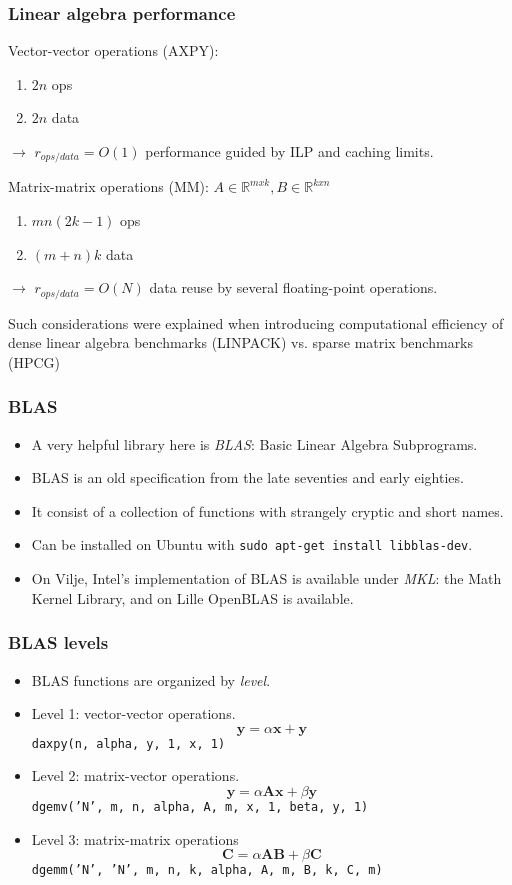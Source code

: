 \begin{frame}
  \frametitle{Linear algebra performance}

Vector-vector operations (AXPY):
\begin{enumerate}
\item $2n$ ops
\item $2n$ data
\end{enumerate}
$\rightarrow$ $r_{ops/data} = O(1)$ performance guided by ILP and caching limits.

\bigskip
Matrix-matrix operations (MM): $A \in \mathbb R^{mxk}, B \in \mathbb R^{kxn}$
\begin{enumerate}
\item $mn(2k-1)$ ops
\item $(m+n)k$ data
\end{enumerate}
$\rightarrow$ $r_{ops/data} = O(N)$ data reuse by several floating-point operations. 

\medskip
Such considerations were explained when introducing computational efficiency of dense linear algebra benchmarks (LINPACK) vs. sparse matrix benchmarks (HPCG)

\end{frame}


\begin{frame}
  \frametitle{BLAS}
  \begin{itemize}
  \item A very helpful library here is \emph{BLAS}: Basic Linear Algebra
    Subprograms.
  \item BLAS is an old specification from the late seventies and early eighties.
  \item It consist of a collection of functions with strangely cryptic and short
    names.
  \item Can be installed on Ubuntu with
    \texttt{sudo apt-get install libblas-dev}.
  \item On Vilje, Intel's implementation of BLAS is available under \emph{MKL}:
    the Math Kernel Library, and on Lille OpenBLAS is available.
  \end{itemize}
\end{frame}


\begin{frame}
  \frametitle{BLAS levels}
  \begin{itemize}
  \item BLAS functions are organized by \emph{level}.
  \item Level 1: vector-vector operations.
    \[ \bm y = \alpha \bm x + \bm y \]
    \texttt{daxpy(n, alpha, y, 1, x, 1)}
  \item Level 2: matrix-vector operations.
    \[ \bm y = \alpha \bm A \bm x + \beta \bm y \]
    \texttt{dgemv('N', m, n, alpha, A, m, x, 1, beta, y, 1)}
  \item Level 3: matrix-matrix operations
    \[ \bm C = \alpha \bm A \bm B + \beta \bm C \]
    \texttt{dgemm('N', 'N', m, n, k, alpha, A, m, B, k, C, m)}
  \end{itemize}
\end{frame}

